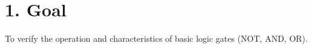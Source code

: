 \section*{1. Goal}
To verify the operation and characteristics of basic logic gates (NOT, AND, OR).
